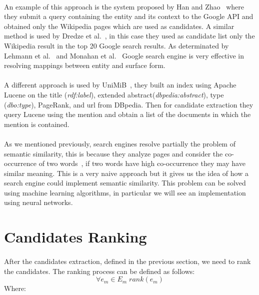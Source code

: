 \paragraph{}
An example of this approach is the system proposed by Han and Zhao~\cite{han2009nlpr_kbp} where they submit a query containing the entity and its context to the Google API and obtained only the Wikipedia pages which are used as candidates. A similar method is used by Dredze et al.~\cite{dredze2010entity}, in this case they used as candidate list only the Wikipedia result in the top 20 Google search results. As determinated by Lehmann et al.~\cite{lehmann2010lcc} and Monahan et al.~\cite{monahan2011cross} Google search engine is very effective in resolving mappings between entity and surface form.

\paragraph{}
A different approach is used by UniMiB~\cite{caliano2016unimib}, they built an index using Apache Lucene on the title (\textit{rdf:label}), extended abstract(\textit{dbpedia:abstract}), type (\textit{dbo:type}), PageRank, and url from DBpedia. Then for candidate extraction they query Lucene using the mention and obtain a list of the documents in which the mention is contained.

\paragraph{}
As we mentioned previously, search engines resolve partially the problem of semantic similarity, this is because they analyze pages and consider the co-occurrence of two words~\cite{bollegala2007measuring}, if two words have high co-occurrence they may have similar meaning. This is a very naive approach but it gives us the idea of how a search engine could implement semantic similarity. This problem can be solved using machine learning algorithms, in particular we will see an implementation using neural networks.

\section{Candidates Ranking}
\paragraph{}
After the candidates extraction, defined in the previous section, we need to rank the candidates. The ranking process can be defined as follows:
\[\forall e_m \in E_m \; rank(e_m)\]
Where:

